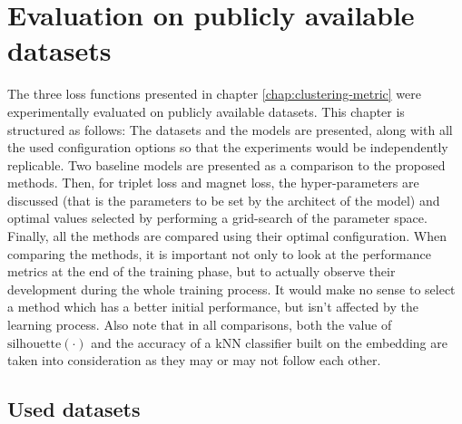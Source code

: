 \chapter{Evaluation on publicly available datasets}\label{chap:toy-dataset}

The three loss functions presented in chapter \ref{chap:clustering-metric} were experimentally evaluated on publicly available datasets. This chapter is structured as follows: The datasets and the models are presented, along with all the used configuration options so that the experiments would be independently replicable. Two baseline models are presented as a comparison to the proposed methods. Then, for triplet loss and magnet loss, the hyper-parameters are discussed (that is the parameters to be set by the architect of the model) and optimal values selected by performing a grid-search of the parameter space. Finally, all the methods are compared using their optimal configuration. When comparing the methods, it is important not only to look at the performance metrics at the end of the training phase, but to actually observe their development during the whole training process. It would make no sense to select a method which has a better initial performance, but isn't affected by the learning process. Also note that in all comparisons, both the value of \( \mathrm{silhouette} \left( \cdot \right) \) and the accuracy of a kNN classifier built on the embedding are taken into consideration as they may or may not follow each other.

\section{Used datasets}

